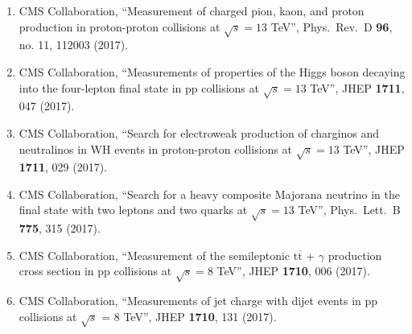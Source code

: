 \begin{enumerate}
\item CMS Collaboration, ``Measurement of charged pion, kaon, and proton production in proton-proton collisions at $\sqrt{s}=13$ TeV'', Phys.\ Rev.\ D {\bf 96}, no. 11, 112003 (2017).

\item CMS Collaboration, ``Measurements of properties of the Higgs boson decaying into the four-lepton final state in pp collisions at $ \sqrt{s}=13 $ TeV'', JHEP {\bf 1711}, 047 (2017).

\item CMS Collaboration, ``Search for electroweak production of charginos and neutralinos in WH events in proton-proton collisions at $ \sqrt{s}=13 $ TeV'', JHEP {\bf 1711}, 029 (2017).

\item CMS Collaboration, ``Search for a heavy composite Majorana neutrino in the final state with two leptons and two quarks at $\sqrt{s}=13$ TeV'', Phys.\ Lett.\ B {\bf 775}, 315 (2017).

\item CMS Collaboration, ``Measurement of the semileptonic $ \mathrm{t}\overline{\mathrm{t}} $ + $\gamma$ production cross section in pp collisions at $ \sqrt{s}=8 $ TeV'', JHEP {\bf 1710}, 006 (2017).

\item CMS Collaboration, ``Measurements of jet charge with dijet events in pp collisions at $\sqrt{s}$ = 8 TeV'', JHEP {\bf 1710}, 131 (2017).


\end{enumerate}
